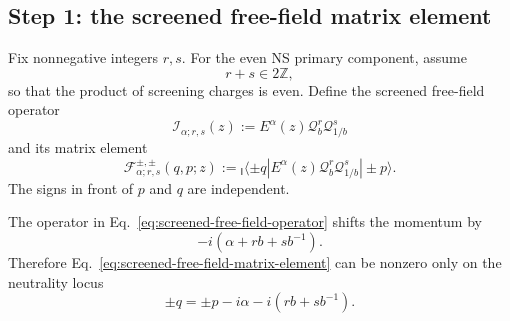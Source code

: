 \documentclass[11pt]{article}
\newcommand{\Ibra}[1]{{}_{\mathsf I}\!\langle #1|}
\begin{document}
\subsection{Step 1: the screened free-field matrix element}

Fix nonnegative integers \(r,s\).  For the even NS primary component, assume
\begin{equation}
 r+s\in2\mathbb Z,
 \label{eq:even-screening-number}
\end{equation}
so that the product of screening charges is even.  Define the screened
free-field operator
\begin{equation}
 \mathcal I_{\alpha;r,s}(z)
 :=
 E^\alpha(z)\mathcal Q_b^r\mathcal Q_{1/b}^s
 \label{eq:screened-free-field-operator}
\end{equation}
and its matrix element
\begin{equation}
 \mathcal F_{\alpha;r,s}^{\pm,\pm}(q,p;z)
 :=
 \Ibra{\pm q}
 E^\alpha(z)\mathcal Q_b^r\mathcal Q_{1/b}^s
 |\pm p\rangle.
 \label{eq:screened-free-field-matrix-element}
\end{equation}
The signs in front of \(p\) and \(q\) are independent.

The operator in Eq.~\eqref{eq:screened-free-field-operator} shifts the
momentum by
\begin{equation}
 -i\left(\alpha+rb+sb^{-1}\right).
 \label{eq:first-total-momentum-shift}
\end{equation}
Therefore Eq.~\eqref{eq:screened-free-field-matrix-element} can be nonzero
only on the neutrality locus
\begin{equation}
 \boxed{
 \pm q
 =
 \pm p-i\alpha-i\left(rb+sb^{-1}\right)
 }.
 \label{eq:first-neutrality-condition}
\end{equation}
\end{document}
